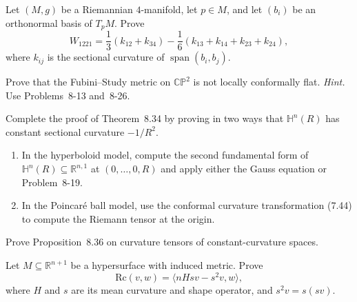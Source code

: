 \begin{exercise}
\label{prob:weyl-tensor-4d}

Let $(M,g)$ be a Riemannian $4$-manifold, let $p\in M$, and let $(b_i)$ be
an orthonormal basis of $T_pM$. Prove
\[
W_{1221}
=\frac13(k_{12}+k_{34})
-\frac16(k_{13}+k_{14}+k_{23}+k_{24}),
\]
where $k_{ij}$ is the sectional curvature of
$\operatorname{span}(b_i,b_j)$.
\end{exercise}

\begin{exercise}
\label{prob:fubini-study-not-conformal-flat}

Prove that the Fubini--Study metric on $\mathbb{CP}^2$ is not locally
conformally flat. \emph{Hint.} Use Problems~8-13 and~8-26.
\end{exercise}

\begin{exercise}
\label{prob:hyperbolic-constant-curvature}

Complete the proof of Theorem~8.34 by proving in two ways that
$\mathbb H^n(R)$ has constant sectional curvature $-1/R^2$.
\begin{enumerate}
\item[(a)] In the hyperboloid model, compute the second fundamental form of
$\mathbb H^n(R)\subseteq\mathbb R^{n,1}$ at $(0,\ldots,0,R)$ and apply either
the Gauss equation or Problem~8-19.
\item[(b)] In the Poincar\'e ball model, use the conformal curvature
transformation (7.44) to compute the Riemann tensor at the origin.
\end{enumerate}
\end{exercise}

\begin{exercise}
\label{prob:curvature-tensors-constant-curvature}

Prove Proposition~8.36 on curvature tensors of constant-curvature spaces.
\end{exercise}

\begin{exercise}
\label{prob:ricci-tensor-hypersurface}

Let $M\subseteq\mathbb R^{n+1}$ be a hypersurface with induced metric. Prove
\[
\mathrm{Rc}(v,w)=\langle nHsv-s^2v,w\rangle,
\]
where $H$ and $s$ are its mean curvature and shape operator, and
$s^2v=s(sv)$.
\end{exercise}

